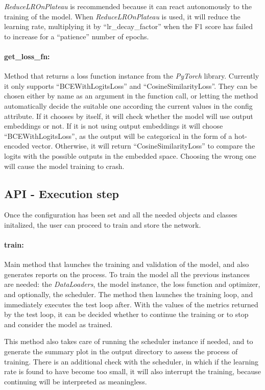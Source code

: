 \documentclass[a4paper, 11pt]{report}
\begin{document}
   \textit{ReduceLROnPlateau} is recommended because it can react autonomously to the training of the model. When \textit{ReduceLROnPlateau} is used, it will reduce the learning rate, multiplying it by ``lr\_decay\_factor'' when the F1 score has failed to increase for a ``patience'' number of epochs.

   \paragraph{get\_loss\_fn:} Method that returns a loss function instance from the \textit{PyTorch} library. Currently it only supports ``BCEWithLogitsLoss'' and ``CosineSimilarityLoss''. They can be chosen either by name as an argument in the function call, or letting the method automatically decide the suitable one according the current values in the config attribute. If it chooses by itself, it will check whether the model will use output embeddings or not. If it is not using output embeddings it will choose ``BCEWithLogitsLoss'', as the output will be categorical in the form of a hot-encoded vector. Otherwise, it will return ``CosineSimilarityLoss'' to compare the logits with the possible outputs in the embedded space. Choosing the wrong one will cause the model training to crash.

   \subsection{API - Execution step}\label{Section: Methodology_Api_train}
   Once the configuration has been set and all the needed objects and classes initalized, the user can proceed to train and store the network.

   \paragraph{train:} Main method that launches the training and validation of the model, and also generates reports on the process. To train the model all the previous instances are needed: the \textit{DataLoaders}, the model instance, the loss function and optimizer, and optionally, the scheduler. The method then launches the training loop, and immediately executes the test loop after. With the values of the metrics returned by the test loop, it can be decided whether to continue the training or to stop and consider the model as trained.

   This method also takes care of running the scheduler instance if needed, and to generate the summary plot in the output directory to assess the process of training. There is an additional check with the scheduler, in which if the learning rate is found to have become too small, it will also interrupt the training, because continuing will be interpreted as meaningless.
\end{document}
